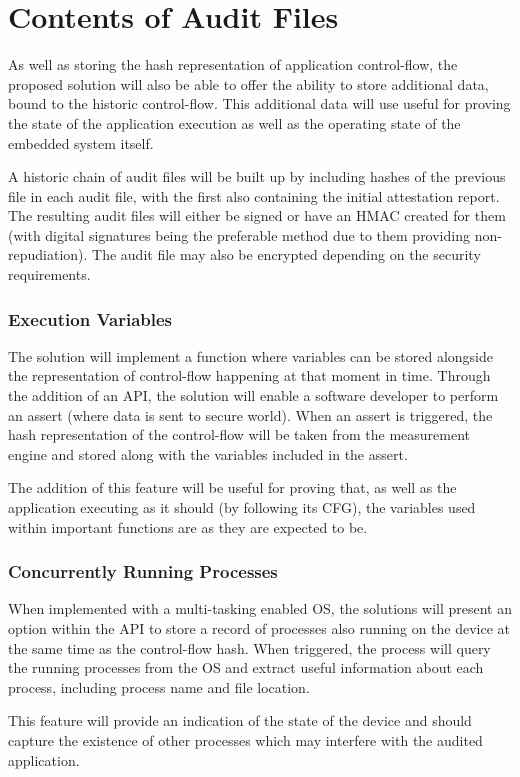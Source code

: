 \section{Contents of Audit Files}

As well as storing the hash representation of application control-flow, the proposed solution will also be able to offer the ability to store additional data, bound to the historic control-flow. This additional data will use useful for proving the state of the application execution as well as the operating state of the embedded system itself.

A historic chain of audit files will be built up by including hashes of the previous file in each audit file, with the first also containing the initial attestation report. The resulting audit files will either be signed or have an HMAC created for them (with digital signatures being the preferable method due to them providing non-repudiation). The audit file may also be encrypted depending on the security requirements. 

\subsubsection*{Execution Variables}

The solution will implement a function where variables can be stored alongside the representation of control-flow happening at that moment in time. Through the addition of an API, the solution will enable a software developer to perform an assert (where data is sent to secure world). When an assert is triggered, the hash representation of the control-flow will be taken from the measurement engine and stored along with the variables included in the assert.

The addition of this feature will be useful for proving that, as well as the application executing as it should (by following its CFG), the variables used within important functions are as they are expected to be.

\subsubsection*{Concurrently Running Processes}

When implemented with a multi-tasking enabled OS, the solutions will present an option within the API to store a record of processes also running on the device  at the same time as the control-flow hash. When triggered, the process will query the running processes from the OS and extract useful information about each process, including process name and file location.

This feature will provide an indication of the state of the device and should capture the existence of other processes which may interfere with the audited application. 
